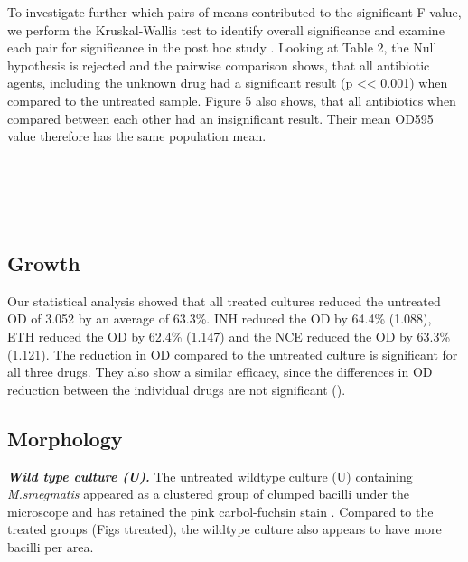 {To investigate further which pairs of means contributed to the significant F-value, we perform the Kruskal-Wallis test to identify overall significance and examine each pair for significance in the post hoc study . Looking at Table 2, the Null hypothesis is rejected and the pairwise comparison  shows, that all antibiotic agents, including the unknown drug had a significant result (p << 0.001) when compared to the untreated sample. Figure 5 also shows, that all antibiotics when compared between each other had an insignificant result. Their mean OD595 value therefore has the same population mean.\\[1em]
\noindent   
\begin{minipage}{22em}
    \footnotesize {}
\end{minipage}\\[1em]

\noindent   
\begin{minipage}{22em}
    \footnotesize {}
\end{minipage}\\[1em]
\\[4em]
\subsection{Growth}
Our statistical analysis showed that all treated cultures reduced the untreated OD of 3.052 by an average of 63.3\%. INH reduced the OD by 64.4\% (1.088), ETH reduced the OD by 62.4\% (1.147) and the NCE reduced the OD by 63.3\% (1.121). The reduction in OD compared to the untreated culture is significant for all three drugs. They also show a similar efficacy, since the differences in OD reduction between the individual drugs are not significant (). 

\subsection{Morphology}
{\small \textit{\textbf{Wild type culture (U).}}}
The untreated wildtype culture (U) containing \textit{M.smegmatis} appeared as a clustered group of clumped bacilli under the microscope and has retained the pink carbol-fuchsin stain . Compared to the treated groups (Figs ttreated), the wildtype culture also appears to have more bacilli per area.\\[1em]
\noindent   
\begin{minipage}{22em}
   {\footnotesize {}}
\end{minipage}\\[1em]

}
